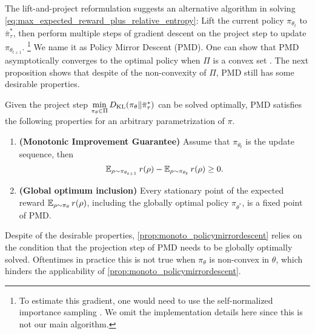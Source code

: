The lift-and-project reformulation suggests an alternative algorithm in solving \cref{eq:max_expected_reward_plus_relative_entropy}: Lift the current policy $\pi_{\theta_t}$ to $\bar{\pi}_\tau^*$, then perform multiple steps of gradient descent on the project step to update $\pi_{\theta_{t+1}}$. \footnote{To estimate this gradient, one would need to use the self-normalized importance sampling \cite{owen2013monte}. We omit the implementation details here since this is not our main algorithm.}
We name it as Policy Mirror Descent (PMD).
One can show that PMD asymptotically converges to the optimal policy when $\Pi$ is a convex set \citep{nemirovskii1983problem,beck2003mirror}. 
The next proposition shows that despite of the non-convexity of $\Pi$, PMD still has some desirable properties.
\begin{prop}
\label{prop:monoto_policymirrordescent}
Given the project step $\min\limits_{\pi_\theta \in \Pi}{D_{\mathrm{KL}}( \pi_\theta \| \bar{\pi}_{\tau}^* )}$ can be solved optimally, PMD satisfies the following properties for an arbitrary parametrization of $\pi$.
\begin{enumerate}
	\item {\bf (Monotonic Improvement Guarantee)} 
	Assume that $\pi_{\theta_{t}}$ is the update sequence, then 
	 \begin{equation*}
	\operatorname{\mathbb{E}}_{\rho \sim \pi_{\theta_{t+1}}}{r(\rho)} - \operatorname{\mathbb{E}}_{\rho \sim \pi_{\theta_{t}}}{  r(\rho)} \ge 0.
	\end{equation*}
	\item {\bf (Global optimum inclusion)} Every stationary point of the expected reward $\operatorname{\mathbb{E}}_{\rho \sim \pi_\theta}{  r(\rho)}$, including the globally optimal policy $\pi_{\theta^*}$,  is a fixed point of PMD.
\end{enumerate}
\end{prop}

Despite of the desirable properties, 
\cref{prop:monoto_policymirrordescent}
relies on the condition that the projection step of PMD needs to be globally optimally solved.
Oftentimes in practice this is not true when $\pi_\theta$ is non-convex in $\theta$, which hinders the applicability of \cref{prop:monoto_policymirrordescent}.

